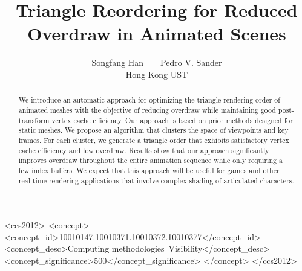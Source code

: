 \documentclass[final]{acmsiggraph}
\title{Triangle Reordering for Reduced Overdraw in Animated Scenes}
\author{ Songfang Han$\qquad$Pedro V. Sander\\[3pt]
  Hong Kong UST}
\begin{document}


\maketitle

\begin{abstract}

We introduce an automatic approach for optimizing the triangle rendering order of animated
meshes with the objective of reducing overdraw while maintaining good post-transform vertex
cache efficiency. Our approach is based on prior methods designed for static meshes. We propose
an algorithm that clusters the space of viewpoints and key frames. For each
cluster, we generate a triangle order that exhibits satisfactory vertex cache efficiency and low overdraw. Results 
show that our approach significantly improves overdraw throughout the entire animation sequence while only 
requiring a few index buffers. We expect that this approach will be useful for games and other real-time
rendering applications that involve complex shading of articulated characters.

\end{abstract}

%
%
\begin{CCSXML}
<ccs2012>
<concept>
<concept_id>10010147.10010371.10010372.10010377</concept_id>
<concept_desc>Computing methodologies~Visibility</concept_desc>
<concept_significance>500</concept_significance>
</concept>
</ccs2012>
\end{CCSXML}
\end{document}
